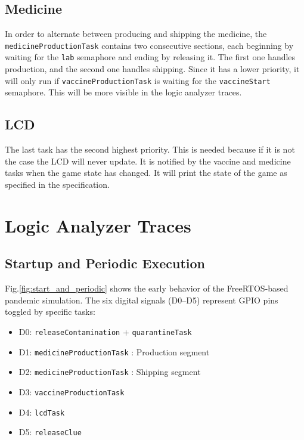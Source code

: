 \documentclass[a4paper, twoside, 12pt]{article}
\begin{document}
\subsection{Medicine}
In order to alternate between producing and shipping the medicine, the \texttt{medicineProductionTask} contains two consecutive sections, each beginning by waiting for the \texttt{lab} semaphore and ending by releasing it. The first one handles production, and the second one handles shipping. Since it has a lower priority, it will only run if \texttt{vaccineProductionTask} is waiting for the \texttt{vaccineStart} semaphore.
This will be more visible in the logic analyzer traces.


\subsection{LCD}
The last task has the second highest priority. This is needed because if it is not the case the LCD will never update. It is notified by the vaccine and medicine tasks when the game state has changed. It will print the state of the game as specified in the
specification.



\section{Logic Analyzer Traces}

\subsection{Startup and Periodic Execution}
Fig.\ref{fig:start_and_periodic} shows the early behavior of the FreeRTOS-based pandemic simulation. The six digital signals (D0–D5) represent GPIO pins toggled by specific tasks:


\begin{itemize}
	\setlength\itemsep{0em}
	\item D0: \texttt{releaseContamination} + \texttt{quarantineTask}
	\item D1: \texttt{medicineProductionTask} : Production segment
	\item D2: \texttt{medicineProductionTask} : Shipping segment
	\item D3: \texttt{vaccineProductionTask}
	\item D4: \texttt{lcdTask}
	\item D5: \texttt{releaseClue}
\end{itemize}
\end{document}
